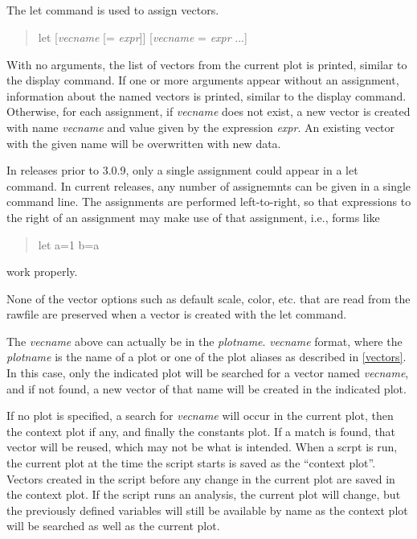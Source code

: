 \subsection{}


The {\cb let} command is used to assign vectors.
\begin{quote}\vt
let [{\it vecname} [= {\it expr\/}]] [{\it vecname} = {\it expr\/} ...]
\end{quote}
With no arguments, the list of vectors from the current plot is
printed, similar to the {\cb display} command.  If one or more
arguments appear without an assignment, information about the named
vectors is printed, similar to the {\cb display} command.  Otherwise,
for each assignment, if {\it vecname} does not exist, a new vector is
created with name {\it vecname} and value given by the expression {\it
expr\/}.  An existing vector with the given name will be overwritten
with new data.

In {\WRspice} releases prior to 3.0.9, only a single assignment could
appear in a {\cb let} command.  In current releases, any number of
assignemnts can be given in a single command line.  The assignments
are performed left-to-right, so that expressions to the right of an
assignment may make use of that assignment, i.e., forms like
\begin{quote}
\vt let a=1 b=a
\end{quote}
work properly.

None of the vector options such as default scale, color, etc.  that
are read from the rawfile are preserved when a vector is created with
the {\cb let} command.

The {\it vecname} above can actually be in the {\it plotname\/}.{\it
vecname} format, where the {\it plotname} is the name of a plot or one
of the plot aliases as described in \ref{vectors}.  In this case, only
the indicated plot will be searched for a vector named {\it
vecname\/}, and if not found, a new vector of that name will be
created in the indicated plot.

If no plot is specified, a search for {\it vecname} will occur in the
current plot, then the context plot if any, and finally the {\vt
constants} plot.  If a match is found, that vector will be reused,
which may not be what is intended.  When a scrpt is run, the current
plot at the time the script starts is saved as the ``context plot''. 
Vectors created in the script before any change in the current plot
are saved in the context plot.  If the script runs an analysis, the
current plot will change, but the previously defined variables will
still be available by name as the context plot will be searched as
well as the current plot.

